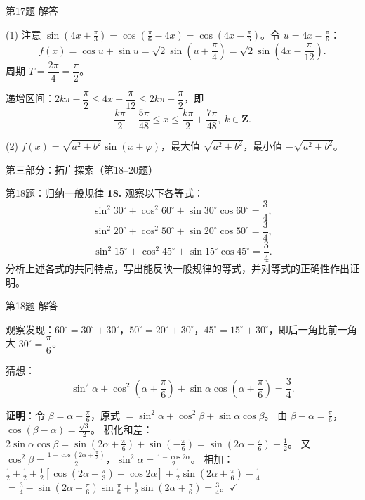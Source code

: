 \documentclass[10pt,aspectratio=169,serif]{beamer}
\begin{document}
\begin{frame}[t]{第17题 解答}
\begin{tcolorbox}[colback=orange!10,colframe=orange,title=\textbf{解}]
(1) 注意 $\sin(4x+\frac{\pi}{3})=\cos(\frac{\pi}{6}-4x)=\cos(4x-\frac{\pi}{6})$。令 $u=4x-\frac{\pi}{6}$：
\[
f(x)=\cos u+\sin u=\sqrt2\sin\!\left(u+\frac{\pi}{4}\right)=\sqrt2\sin\!\left(4x-\frac{\pi}{12}\right).
\]
周期 $T=\dfrac{2\pi}{4}=\dfrac{\pi}{2}$。

递增区间：$2k\pi-\dfrac{\pi}{2}\le 4x-\dfrac{\pi}{12}\le 2k\pi+\dfrac{\pi}{2}$，即
\[
\frac{k\pi}{2}-\frac{5\pi}{48}\le x\le \frac{k\pi}{2}+\frac{7\pi}{48},\ k\in\mathbf{Z}.
\]

(2) $f(x)=\sqrt{a^2+b^2}\sin(x+\varphi)$，最大值 $\sqrt{a^2+b^2}$，最小值 $-\sqrt{a^2+b^2}$。
\end{tcolorbox}
\end{frame}

\begin{frame}{第三部分：拓广探索（第18--20题）}
\end{frame}

\begin{frame}[t]{第18题：归纳一般规律}
\textbf{18.} 观察以下各等式：
\[
\sin^2 30^\circ+\cos^2 60^\circ+\sin30^\circ\cos60^\circ=\frac34,
\]
\[
\sin^2 20^\circ+\cos^2 50^\circ+\sin20^\circ\cos50^\circ=\frac34,
\]
\[
\sin^2 15^\circ+\cos^2 45^\circ+\sin15^\circ\cos45^\circ=\frac34.
\]
分析上述各式的共同特点，写出能反映一般规律的等式，并对等式的正确性作出证明。
\end{frame}

\begin{frame}[t]{第18题 解答}
\begin{tcolorbox}[colback=orange!10,colframe=orange,title=\textbf{解}]
观察发现：$60^\circ=30^\circ+30^\circ$，$50^\circ=20^\circ+30^\circ$，$45^\circ=15^\circ+30^\circ$，即后一角比前一角大 $30^\circ=\dfrac{\pi}{6}$。

\alert{猜想}：
\[
\sin^2\alpha+\cos^2\!\left(\alpha+\frac{\pi}{6}\right)+\sin\alpha\cos\!\left(\alpha+\frac{\pi}{6}\right)=\frac34.
\]

\textbf{证明}：令 $\beta=\alpha+\frac{\pi}{6}$，原式 $=\sin^2\alpha+\cos^2\beta+\sin\alpha\cos\beta$。
由 $\beta-\alpha=\frac{\pi}{6}$，$\cos(\beta-\alpha)=\frac{\sqrt3}{2}$。
积化和差：$2\sin\alpha\cos\beta=\sin(2\alpha+\frac{\pi}{6})+\sin(-\frac{\pi}{6})=\sin(2\alpha+\frac{\pi}{6})-\frac12$。
又 $\cos^2\beta=\frac{1+\cos(2\alpha+\frac{\pi}{3})}{2}$，$\sin^2\alpha=\frac{1-\cos 2\alpha}{2}$。
相加：$\frac12+\frac12+\frac12[\cos(2\alpha+\frac{\pi}{3})-\cos 2\alpha]+\frac12\sin(2\alpha+\frac{\pi}{6})-\frac14$
$=\frac34-\sin(2\alpha+\frac{\pi}{6})\sin\frac{\pi}{6}+\frac12\sin(2\alpha+\frac{\pi}{6})=\frac34$。$\checkmark$
\end{tcolorbox}
\end{frame}
\end{document}
